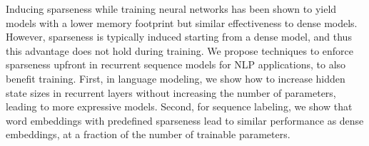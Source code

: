 Inducing sparseness while training neural networks has been shown to yield models with a lower memory footprint but similar effectiveness to dense models. However, sparseness is typically induced starting from a dense model, and thus this advantage does not hold during training. We propose techniques to enforce sparseness upfront in recurrent sequence models for NLP applications, to also benefit training. First, in language modeling, we show how to increase hidden state sizes in recurrent layers without increasing the number of parameters, leading to more expressive models. Second, for sequence labeling, we show that word embeddings with predefined sparseness lead to similar performance as dense embeddings, at a fraction of the number of trainable parameters.
